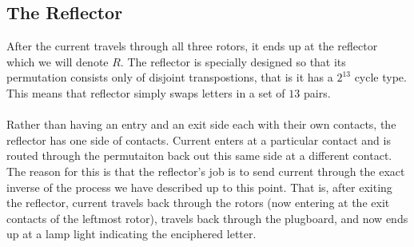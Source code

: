 

\subsection{The Reflector}
After the current travels through all three rotors, it ends up at the
reflector which we will denote $R$. The reflector is specially
designed so that its permutation consists only of disjoint
transpostions, that is it has a $2^{13}$ cycle type. This means that
reflector simply swaps letters in a set of $13$ pairs.
\\\\Rather than having an entry and an exit side each with their own
contacts, the reflector has one side of contacts. Current enters at a
particular contact and is routed through the permutaiton back out
this same side at a different contact. The reason for this is that
the reflector's job is to send current through the exact inverse of
the process we have described up to this point. That is, after
exiting the reflector, current travels back through the rotors (now
entering at the exit contacts of the leftmost rotor), travels back
through the plugboard, and now ends up at a lamp light indicating the
enciphered letter.

